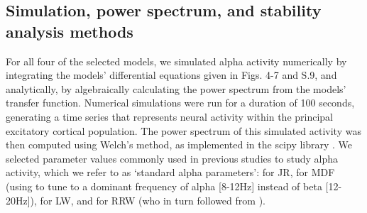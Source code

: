 \documentclass[12pt,twoside]{article}
\begin{document}

\subsection{Simulation, power spectrum, and stability analysis methods}
For all four of the selected models, we simulated alpha activity numerically by integrating the models' differential equations given in Figs. 4-7 and S.9, and analytically, by algebraically calculating the power spectrum from the models' transfer function. Numerical simulations were run for a duration of 100 seconds, generating a time series that represents neural activity within the principal excitatory cortical population. The power spectrum of this simulated activity was then computed using Welch's method, as implemented in the scipy library \citep{2020SciPy-NMeth}. We selected parameter values commonly used in previous studies to study alpha activity, which we refer to as `standard alpha parameters': \citet{jansen1995electroencephalogram} for JR, \citet{moran2007neural} for MDF (using \citealp{david2003neural} to tune to a dominant frequency of alpha [8-12Hz] instead of beta [12-20Hz]), \citet{liley2001spatially} for LW, and \citet{zhao2015generalized} for RRW (who in turn followed from \citet{robinson2002dynamics, rowe2004estimation}). 

\end{document}
